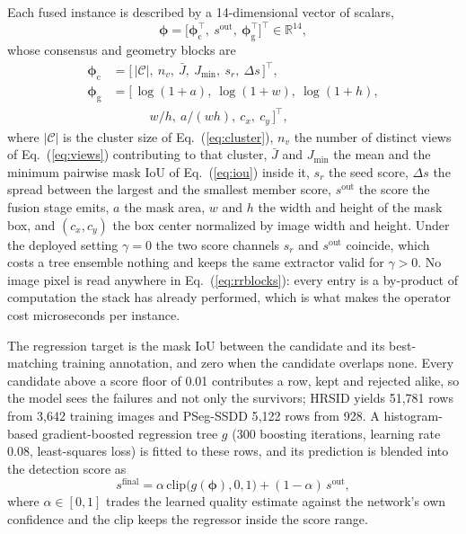 Each fused instance is described by a 14-dimensional vector of scalars,
\begin{equation}\label{eq:rrfeat}
\boldsymbol{\phi}=\bigl[\boldsymbol{\phi}_{\mathrm{c}}^{\top},\ s^{\mathrm{out}},\ \boldsymbol{\phi}_{\mathrm{g}}^{\top}\bigr]^{\top}\in\mathbb{R}^{14},
\end{equation}
whose consensus and geometry blocks are
\begin{equation}\label{eq:rrblocks}
\begin{split}
\boldsymbol{\phi}_{\mathrm{c}}&=\bigl[\,|\mathcal{C}|,\ n_v,\ \bar{J},\ J_{\min},\ s_r,\ \Delta s\,\bigr]^{\top},\\
\boldsymbol{\phi}_{\mathrm{g}}&=\bigl[\,\log(1{+}a),\ \log(1{+}w),\ \log(1{+}h),\\
&\qquad\quad w/h,\ a/(wh),\ c_x,\ c_y\,\bigr]^{\top},
\end{split}
\end{equation}
where $|\mathcal{C}|$ is the cluster size of Eq.~(\ref{eq:cluster}), $n_v$ the number of distinct views of Eq.~(\ref{eq:views}) contributing to that cluster, $\bar{J}$ and $J_{\min}$ the mean and the minimum pairwise mask IoU of Eq.~(\ref{eq:iou}) inside it, $s_r$ the seed score, $\Delta s$ the spread between the largest and the smallest member score, $s^{\mathrm{out}}$ the score the fusion stage emits, $a$ the mask area, $w$ and $h$ the width and height of the mask box, and $(c_x,c_y)$ the box center normalized by image width and height. Under the deployed setting $\gamma=0$ the two score channels $s_r$ and $s^{\mathrm{out}}$ coincide, which costs a tree ensemble nothing and keeps the same extractor valid for $\gamma>0$. No image pixel is read anywhere in Eq.~(\ref{eq:rrblocks}): every entry is a by-product of computation the stack has already performed, which is what makes the operator cost microseconds per instance.

The regression target is the mask IoU between the candidate and its best-matching training annotation, and zero when the candidate overlaps none. Every candidate above a score floor of 0.01 contributes a row, kept and rejected alike, so the model sees the failures and not only the survivors; HRSID yields 51{,}781 rows from 3{,}642 training images and PSeg-SSDD 5{,}122 rows from 928. A histogram-based gradient-boosted regression tree $g$ (300 boosting iterations, learning rate 0.08, least-squares loss) is fitted to these rows, and its prediction is blended into the detection score as
\begin{equation}\label{eq:rrblend}
s^{\mathrm{final}}=\alpha\,\mathrm{clip}\bigl(g(\boldsymbol{\phi}),0,1\bigr)+(1-\alpha)\,s^{\mathrm{out}},
\end{equation}
where $\alpha\in[0,1]$ trades the learned quality estimate against the network's own confidence and the clip keeps the regressor inside the score range.

